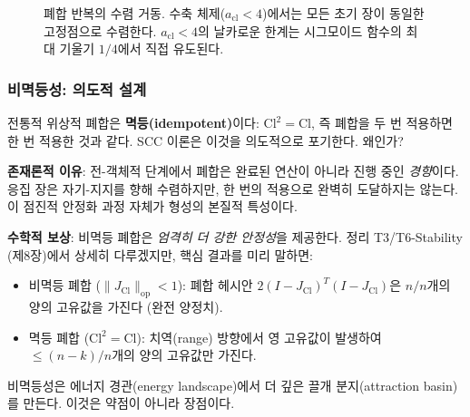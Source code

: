 \begin{figure}[t]
\centering
\caption{폐합 반복의 수렴 거동. 수축 체제($a_{\mathrm{cl}} < 4$)에서는 모든 초기 장이 동일한 고정점으로 수렴한다. $a_{\mathrm{cl}} < 4$의 날카로운 한계는 시그모이드 함수의 최대 기울기 $1/4$에서 직접 유도된다.}
\label{fig:closure-iteration}
\end{figure}


\subsubsection{비멱등성: 의도적 설계}

전통적 위상적 폐합은 \textbf{멱등(idempotent)}이다: $\mathrm{Cl}^2 = \mathrm{Cl}$, 즉 폐합을 두 번 적용하면 한 번 적용한 것과 같다. SCC 이론은 이것을 의도적으로 포기한다. 왜인가?

\textbf{존재론적 이유}: 전-객체적 단계에서 폐합은 완료된 연산이 아니라 진행 중인 \emph{경향}이다. 응집 장은 자기-지지를 향해 수렴하지만, 한 번의 적용으로 완벽히 도달하지는 않는다. 이 점진적 안정화 과정 자체가 형성의 본질적 특성이다.

\textbf{수학적 보상}: 비멱등 폐합은 \emph{엄격히 더 강한 안정성}을 제공한다. 정리 T3/T6-Stability (제8장)에서 상세히 다루겠지만, 핵심 결과를 미리 말하면:
\begin{itemize}
    \item 비멱등 폐합 ($\|J_{\mathrm{Cl}}\|_{\mathrm{op}} < 1$): 폐합 헤시안 $2(I - J_{\mathrm{Cl}})^T(I - J_{\mathrm{Cl}})$은 $n/n$개의 양의 고유값을 가진다 (완전 양정치).
    \item 멱등 폐합 ($\mathrm{Cl}^2 = \mathrm{Cl}$): 치역(range) 방향에서 영 고유값이 발생하여 $\leq (n-k)/n$개의 양의 고유값만 가진다.
\end{itemize}
비멱등성은 에너지 경관(energy landscape)에서 더 깊은 끌개 분지(attraction basin)를 만든다. 이것은 약점이 아니라 장점이다.

